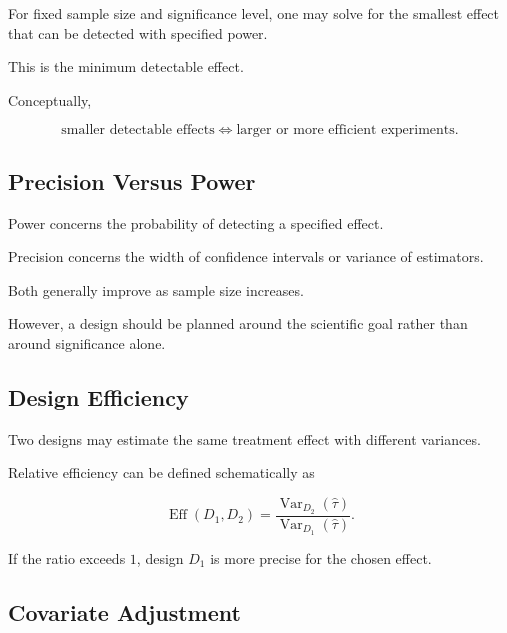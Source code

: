 For fixed sample size and significance level, one may solve for the
smallest effect that can be detected with specified power.

This is the minimum detectable effect.

Conceptually,

\[
\boxed{
\text{smaller detectable effects}
\Longleftrightarrow
\text{larger or more efficient experiments}.
}
\]

\subsection{Precision Versus Power}
\label{subsec:precision-versus-power-design}

Power concerns the probability of detecting a specified effect.

Precision concerns the width of confidence intervals or variance of
estimators.

Both generally improve as sample size increases.

However, a design should be planned around the scientific goal rather
than around significance alone.

\subsection{Design Efficiency}
\label{subsec:design-efficiency}

Two designs may estimate the same treatment effect with different
variances.

Relative efficiency can be defined schematically as

\[
\boxed{
\operatorname{Eff}(D_1,D_2)
=
\frac{
\operatorname{Var}_{D_2}(\widehat{\tau})
}{
\operatorname{Var}_{D_1}(\widehat{\tau})
}.
}
\]

If the ratio exceeds \(1\), design \(D_1\) is more precise for the chosen
effect.

\subsection{Covariate Adjustment}
\label{subsec:covariate-adjustment-design}

